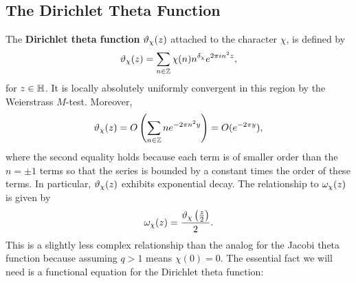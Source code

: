     \subsection*{The Dirichlet Theta Function}
      The \textbf{Dirichlet theta function} $\vartheta_{\chi}(z)$ attached to the character $\chi$, is defined by
      \[
        \vartheta_{\chi}(z) = \sum_{n \in \mathbb{Z}}\chi(n)n^{\delta_{\chi}}e^{2\pi in^{2}z},
      \]
      for $z \in \mathbb{H}$. It is locally absolutely uniformly convergent in this region by the Weierstrass $M$-test. Moreover,
      \[
        \vartheta_{\chi}(z) = O\left(\sum_{n \in \mathbb{Z}}ne^{-2\pi n^{2}y}\right) = O(e^{-2\pi y}),
      \]
      where the second equality holds because each term is of smaller order than the $n = \pm 1$ terms so that the series is bounded by a constant times the order of these terms. In particular, $\vartheta_{\chi}(z)$ exhibits exponential decay. The relationship to $\omega_{\chi}(z)$ is given by
      \[
        \omega_{\chi}(z) = \frac{\vartheta_{\chi}\left(\frac{z}{2}\right)}{2}.
      \]
      This is a slightly less complex relationship than the analog for the Jacobi theta function because assuming $q > 1$ means $\chi(0) = 0$. The essential fact we will need is a functional equation for the Dirichlet theta function:

